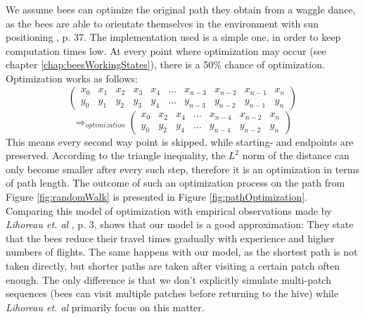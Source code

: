 		We assume bees can optimize the original path they obtain from a waggle dance, as the bees are able to orientate themselves in the environment with sun positioning \cite{seeley95}, p. 37. The implementation used is a simple one, in order to keep computation times low. At every point where optimization may occur (see chapter \ref{chap:beesWorkingStates}), there is a 50\% chance of optimization. Optimization works as follows:
		\[
			\begin{pmatrix}
				x_0 & x_1 & x_2 & x_3 & x_4 & \ldots & x_{n-3} & x_{n-2} & x_{n-1} & x_n \\
				y_0 & y_1 & y_2 & y_3 & y_4 & \ldots & y_{n-3} & y_{n-2} & y_{n-1} & y_n
			\end{pmatrix}
		\]
		\[
			\Longrightarrow_{optimization}
			\begin{pmatrix}
				x_0 & x_2 & x_4 & \ldots & x_{n-4} & x_{n-2} & x_{n} \\ y_0 & y_2 & y_4 & \ldots & y_{n-4} & y_{n-2} & y_{n}
			\end{pmatrix}
		\]
		This means every second way point is skipped, while starting- and endpoints are preserved. According to the triangle inequality, the $L^2$ norm of the distance can only become smaller after every such step, therefore it is an optimization in terms of path length. The outcome of such an optimization process on the path from Figure \ref{fig:randomWalk} is presented in Figure \ref{fig:pathOptimization}.\\
		Comparing this model of optimization with empirical observations made by \textit{Lihoreau et. al} \cite{lihoreau11}, p. 3, shows that our model is a good approximation: They state that the bees reduce their travel times gradually with experience and higher numbers of flights. The same happens with our model, as the shortest path is not taken directly, but shorter paths are taken after visiting a certain patch often enough. The only difference is that we don't explicitly simulate multi-patch sequences (bees can visit multiple patches before returning to the hive) while \textit{Lihoreau et. al} primarily focus on this matter.